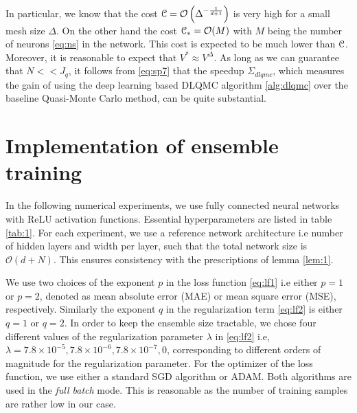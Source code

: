 \documentclass[a4paper]{article}
\numberwithin{equation}{section}
\numberwithin{equation}{section}
\theoremstyle{definition}
\theoremstyle{myremarkstyle}
\newcommand{\cO}{{\mathcal O}}
\newcommand{\cost}{\EuScript{C}}
\begin{document}
\begin{remark}
    In particular, we know that the cost $\cost = {\mathcal O}\left(\Delta ^{-\frac{1}{d+1}}\right)$ is very high for a small mesh size $\Delta$. On the other hand the cost $\cost_{\ast} = \cO(M)$ with $M$ being the number of neurons \eqref{eq:ns} in the network. This cost is expected to be much lower than $\cost$. Moreover, it is reasonable to expect that $V^{\ast} \approx V^{\Delta}$. As long as we can guarantee that $N << J_q$, it follows from \eqref{eq:sp7} that the speedup $\Sigma_{dlqmc}$, which measures the gain of using the deep learning based DLQMC algorithm \ref{alg:dlqmc} over the baseline Quasi-Monte Carlo method, can be quite substantial.
\end{remark} 
\section{Implementation of ensemble training}
\label{sec:imp}
In the following numerical experiments, we use fully connected neural networks with ReLU activation functions. Essential hyperparameters are listed in table \ref{tab:1}. For each experiment, we use a reference network architecture i.e number of hidden layers and width per layer, such that the total network size is $\cO(d + N)$. This ensures consistency with the prescriptions of lemma \ref{lem:1}. 

We use two choices of the exponent $p$ in the loss function \eqref{eq:lf1} i.e either $p=1$ or $p=2$, denoted as mean absolute error (MAE) or mean square error (MSE), respectively. Similarly the exponent $q$ in the regularization term \eqref{eq:lf2} is either $q=1$ or $q=2$. In order to keep the ensemble size tractable, we chose four different values of the regularization parameter $\lambda$ in \eqref{eq:lf2} i.e, $\lambda = 7.8\times10^{-5}, 7.8\times10^{-6}, 7.8\times10^{-7},0$, corresponding to different orders of magnitude for the regularization parameter. For the optimizer of the loss function, we use either a standard SGD algorithm or ADAM. Both algorithms are used in the \emph{full batch} mode. This is reasonable as the number of training samples are rather low in our case. 
\end{document}
